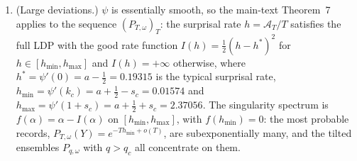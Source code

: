 \documentclass[aps,prx,reprint,superscriptaddress,nobibnotes,longbibliography]{revtex4-2}
\begin{document}
\begin{enumerate}
affine outside this interval.
\item[(v)] (Large deviations.)  $\psi$ is essentially smooth, so the
main-text Theorem~7 applies to the sequence $(P_{T,\omega})_T$: the
surprisal rate $h=\mathcal A_T/T$ satisfies the full LDP with the good
rate function $I(h)=\tfrac12(h-h^*)^2$ for $h\in[h_{\min},h_{\max}]$ and
$I(h)=+\infty$ otherwise, where $h^*=\psi'(0)=a-\tfrac12=0.19315$ is the
typical surprisal rate, $h_{\min}=\psi'(k_c)=a+\tfrac12-s_c=0.01574$ and
$h_{\max}=\psi'(1+s_c)=a+\tfrac12+s_c=2.37056$.  The singularity
spectrum is $f(\alpha)=\alpha-I(\alpha)$ on $[h_{\min},h_{\max}]$, with
$f(h_{\min})=0$: the most probable records,
$P_{T,\omega}(Y)=e^{-Th_{\min}+o(T)}$, are subexponentially many, and
the tilted ensembles $P_{q,\omega}$ with $q>q_c$ all concentrate on
them.
\end{enumerate}
\end{document}
